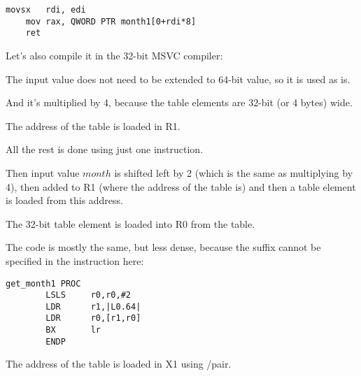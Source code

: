 \begin{lstlisting}[caption=\Optimizing GCC 4.9 x64]
	movsx	rdi, edi
	mov	rax, QWORD PTR month1[0+rdi*8]
	ret
\end{lstlisting}


Let's also compile it in the 32-bit MSVC compiler:



The input value does not need to be extended to 64-bit value, so it is used as is.

And it's multiplied by 4, because the table elements are 32-bit (or 4 bytes) wide.






The address of the table is loaded in R1.

All the rest is done using just one \LDR instruction.

Then input value $month$ is shifted left by 2 (which is the same as multiplying by 4), then added
to R1 (where the address of the table is) and then a table element is loaded from this address.

The 32-bit table element is loaded into R0 from the table.


The code is mostly the same, but less dense, because the \LSL suffix cannot be specified in the \LDR instruction here:

\begin{lstlisting}
get_month1 PROC
        LSLS     r0,r0,#2
        LDR      r1,|L0.64|
        LDR      r0,[r1,r0]
        BX       lr
        ENDP
\end{lstlisting}





The address of the table is loaded in X1 using \ADRP/\ADD pair.

